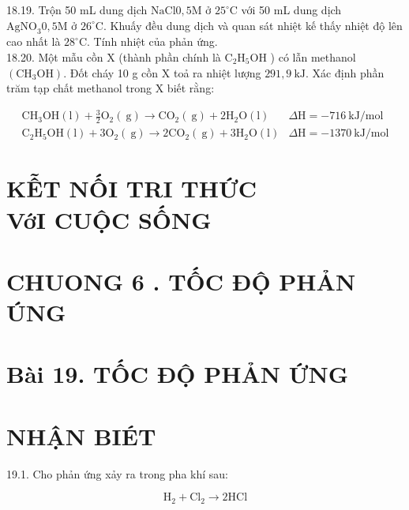 \documentclass[10pt]{article}
\begin{document}
18.19. Trộn 50 mL dung dịch $\mathrm{NaCl} 0,5 \mathrm{M}$ ở $25^{\circ} \mathrm{C}$ với 50 mL dung dịch $\mathrm{AgNO}_{3} 0,5 \mathrm{M}$ ở $26^{\circ} \mathrm{C}$. Khuấy đều dung dịch và quan sát nhiệt kế thấy nhiệt độ lên cao nhất là $28^{\circ} \mathrm{C}$. Tính nhiệt của phản ứng.\\
18.20. Một mẫu cồn X (thành phần chính là $\mathrm{C}_{2} \mathrm{H}_{5} \mathrm{OH}$ ) có lẫn methanol $\left(\mathrm{CH}_{3} \mathrm{OH}\right)$. Đốt cháy 10 g cồn X toả ra nhiệt lượng $291,9 \mathrm{~kJ}$. Xác định phần trăm tạp chất methanol trong X biết rằng:

$$
\begin{array}{ll}
\mathrm{CH}_{3} \mathrm{OH}(\mathrm{l})+\frac{3}{2} \mathrm{O}_{2}(\mathrm{~g}) \rightarrow \mathrm{CO}_{2}(\mathrm{~g})+2 \mathrm{H}_{2} \mathrm{O}(\mathrm{l}) & \Delta \mathrm{H}=-716 \mathrm{~kJ} / \mathrm{mol} \\
\mathrm{C}_{2} \mathrm{H}_{5} \mathrm{OH}(\mathrm{l})+3 \mathrm{O}_{2}(\mathrm{~g}) \rightarrow 2 \mathrm{CO}_{2}(\mathrm{~g})+3 \mathrm{H}_{2} \mathrm{O}(\mathrm{l}) & \Delta \mathrm{H}=-1370 \mathrm{~kJ} / \mathrm{mol}
\end{array}
$$

\section*{KỄT NỐI TRI THỨC \\
 VớI CUỘC SỐNG}
\section*{CHUONG 6 . TỐC ĐỘ PHẢN ÚNG}
\section*{Bài 19. TỐC ĐỘ PHẢN ỨNG}
\section*{NHẬN BIÉT}
19.1. Cho phản ứng xảy ra trong pha khí sau:

$$
\mathrm{H}_{2}+\mathrm{Cl}_{2} \rightarrow 2 \mathrm{HCl}
$$
\end{document}
